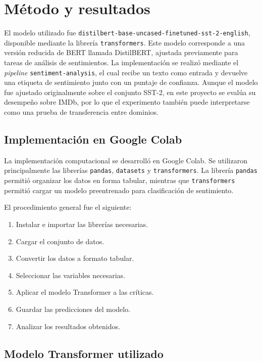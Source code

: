 \documentclass[11pt,letterpaper]{article}
\begin{document}
	\section{Método y resultados}
	
	El modelo utilizado fue \texttt{distilbert-base-uncased-finetuned-sst-2-english}, disponible mediante la librería \texttt{transformers}. Este modelo corresponde a una versión reducida de BERT llamada DistilBERT, ajustada previamente para tareas de análisis de sentimientos. La implementación se realizó mediante el \textit{pipeline} \texttt{sentiment-analysis}, el cual recibe un texto como entrada y devuelve una etiqueta de sentimiento junto con un puntaje de confianza. Aunque el modelo fue ajustado originalmente sobre el conjunto SST-2, en este proyecto se evalúa su desempeño sobre IMDb, por lo que el experimento también puede interpretarse como una prueba de transferencia entre dominios.
	
	\subsection{Implementación en Google Colab}
	
	La implementación computacional se desarrolló en Google Colab. Se utilizaron principalmente las librerías \texttt{pandas}, \texttt{datasets} y \texttt{transformers}. La librería \texttt{pandas} permitió organizar los datos en forma tabular, mientras que \texttt{transformers} permitió cargar un modelo preentrenado para clasificación de sentimiento.
	
	El procedimiento general fue el siguiente:
	
	\begin{enumerate}
		\item Instalar e importar las librerías necesarias.
		\item Cargar el conjunto de datos.
		\item Convertir los datos a formato tabular.
		\item Seleccionar las variables necesarias.
		\item Aplicar el modelo Transformer a las críticas.
		\item Guardar las predicciones del modelo.
		\item Analizar los resultados obtenidos.
	\end{enumerate}
	
	\subsection{Modelo Transformer utilizado}
	
\end{document}
